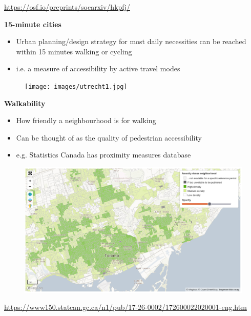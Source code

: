 \documentclass[aspectratio=169]{beamer}
\begin{document}
\begin{frame}
\begin{columns}
\begin{column}{0.5\textwidth}
		\end{column}
		
	\end{columns}

	\vspace{3mm}

	\tiny\url{https://osf.io/preprints/socarxiv/hkpfj/}
	
\end{frame}




\begin{frame}
	
	\textbf{15-minute cities}
	
	\begin{itemize}
		\item Urban planning/design strategy for most daily necessities can be reached within 15 minutes walking or cycling
		\item i.e. a measure of accessibility by active travel modes
	\end{itemize}
	
	\begin{figure}
		\centering
		\texttt{[image: images/utrecht1.jpg]}
	\end{figure}
	
\end{frame}





\begin{frame}
	
	\textbf{Walkability}
	
	\begin{itemize}
		\item How friendly a neighbourhood is for walking
		\item Can be thought of as the quality of pedestrian accessibility
		\item e.g. Statistics Canada has proximity measures database
	\end{itemize}
	
	\begin{figure}
		\centering
		\includegraphics[width=0.76\linewidth]{images/pmd.png}
	\end{figure}
	
	\tiny\url{https://www150.statcan.gc.ca/n1/pub/17-26-0002/172600022020001-eng.htm}
	
	
\end{frame}
\end{document}
